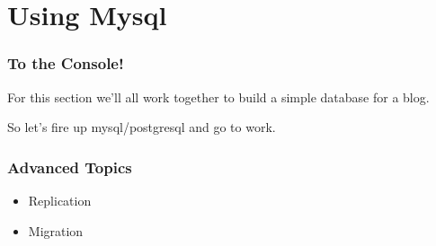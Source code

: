 \documentclass{beamer}
\begin{document}
\section{Using Mysql}

\begin{frame}
  \frametitle{To the Console!}
	For this section we'll all work together to build a simple database for a blog.

So let's fire up mysql/postgresql and go to work.
\end{frame}

\begin{frame}
  \frametitle{Advanced Topics}
  \begin{itemize}
    \item Replication
    \item Migration
  \end{itemize}
\end{frame}
\end{document}
